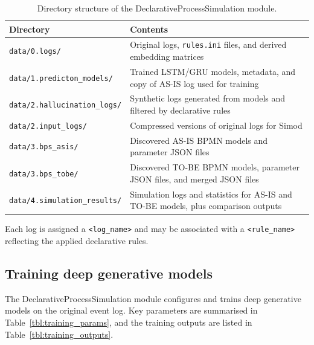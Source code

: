 \documentclass[a4paper,fleqn]{cas-sc}
\begin{document}
\begin{table}[width=.95\linewidth,cols=2,pos=t]
\caption{Directory structure of the DeclarativeProcessSimulation module.}
\label{tbl:directory_layout}
\begin{tabular*}{\tblwidth}{@{} LL @{}}
\toprule
Directory & Contents \\
\midrule
\verb|data/0.logs/| & Original logs, \verb|rules.ini| files, and derived embedding matrices \\
\verb|data/1.predicton_models/| & Trained LSTM/GRU models, metadata, and copy of AS-IS log used for training \\
\verb|data/2.hallucination_logs/| & Synthetic logs generated from models and filtered by declarative rules \\
\verb|data/2.input_logs/| & Compressed versions of original logs for Simod \\
\verb|data/3.bps_asis/| & Discovered AS-IS BPMN models and parameter JSON files \\
\verb|data/3.bps_tobe/| & Discovered TO-BE BPMN models, parameter JSON files, and merged JSON files \\
\verb|data/4.simulation_results/| & Simulation logs and statistics for AS-IS and TO-BE models, plus comparison outputs \\
\bottomrule
\end{tabular*}
\end{table}

Each log is assigned a \verb|<log_name>| and may be associated
with a \verb|<rule_name>| reflecting the applied declarative
rules.

\subsection{Training deep generative models}

The DeclarativeProcessSimulation module configures and trains deep
generative models on the original event log.
Key parameters are summarised in Table~\ref{tbl:training_params},
and the training outputs are listed in Table~\ref{tbl:training_outputs}.
\end{document}
